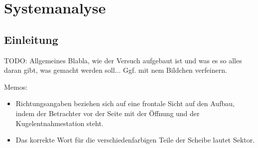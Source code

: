 \documentclass[11pt,a4paper]{scrartcl}
\begin{document}
\section{Systemanalyse}
\subsection{Einleitung}
TODO: Allgemeines Blabla, wie der Versuch aufgebaut ist und was es so alles daran gibt, was gemacht werden soll... Ggf. mit nem Bildchen verfeinern.
\par %
Memos:
\begin{itemize}
	\item Richtungsangaben beziehen sich auf eine frontale Sicht auf den Aufbau, indem der Betrachter vor der Seite mit der Öffnung und der Kugelentnahmestation steht.
	\item Das korrekte Wort für die verschiedenfarbigen Teile der Scheibe lautet \glqq Sektor\grqq.
\end{itemize}
\end{document}
